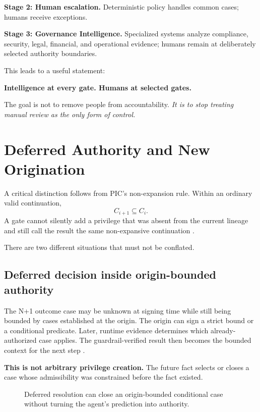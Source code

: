 \documentclass[10pt,oneside,openany]{book}
\begin{document}
\textbf{Stage 2: Human escalation.} Deterministic policy handles common cases; humans receive exceptions.

\textbf{Stage 3: Governance Intelligence.} Specialized systems analyze compliance, security, legal, financial, and operational evidence; humans remain at deliberately selected authority boundaries.

This leads to a useful statement:

\begin{center}
\sffamily\bfseries
Intelligence at every gate. Humans at selected gates.
\end{center}

The goal is not to remove people from accountability. \emph{It is to stop treating manual review as the only form of control.}

\chapter{Deferred Authority and New Origination}

A critical distinction follows from PIC's non-expansion rule. Within an ordinary valid continuation,
\[
C_{i+1}\subseteq C_i.
\]
A gate cannot silently add a privilege that was absent from the current lineage and still call the result the same non-expansive continuation \cite{gallo2026pic}.

There are two different situations that must not be conflated.

\section{Deferred decision inside origin-bounded authority}
The N+1 outcome case may be unknown at signing time while still being bounded by cases established at the origin. The origin can sign a strict bound or a conditional predicate. Later, runtime evidence determines which already-authorized case applies. The guardrail-verified result then becomes the bounded context for the next step \cite{picwhy}.

\textbf{This is not arbitrary privilege creation.} The future fact selects or closes a case whose admissibility was constrained before the fact existed.

\begin{figure}[ht]
\centering
{}
\caption{Deferred resolution can close an origin-bounded conditional case without turning the agent's prediction into authority.}
\end{figure}
\end{document}
